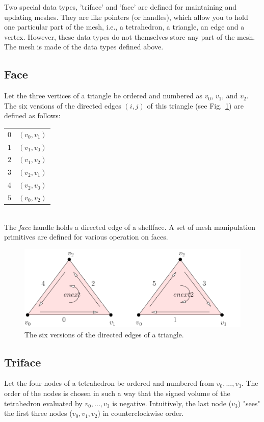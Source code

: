 Two special data types, 'triface' and 'face' are defined for maintaining and updating meshes. They are like pointers (or handles), which allow you to hold one particular part of the mesh, i.e., a tetrahedron, a triangle, an edge and a vertex.  However, these data types do not themselves store any part of the mesh. The mesh is made of the data types defined above.

\subsection{Face}

Let the three vertices of a triangle be ordered and numbered as $v_0$, $v_1$, and $v_2$. The six versions of the directed edges $(i, j)$ of this triangle (see Fig.~\ref{fig:edge-versions}) are defined as follows:\\
\begin{tabular}{rl}
$0$ & $(v_0, v_1)$\\
$1$ & $(v_1, v_0)$\\
$2$ & $(v_1, v_2)$\\
$3$ & $(v_2, v_1)$\\
$4$ & $(v_2, v_0)$\\
$5$ & $(v_0, v_2)$
\end{tabular}\\
The {\it face} handle holds a directed edge of a shellface. A set of mesh manipulation primitives are defined for various operation on faces.

\begin{figure}
  \centering
  \includegraphics[width=1.0\textwidth]{../figs/face-versions}
\caption{The six versions of the directed edges of a triangle.}
\label{fig:edge-versions}
\end{figure}

\subsection{Triface}

Let the four nodes of a tetrahedron be ordered and numbered from $v_0, ..., v_3$. The order of the nodes is chosen in such a way that the signed volume of the tetrahedron evaluated by $v_0, ..., v_3$ is negative. Intuitively, the last node ($v_3$) "sees" the first three nodes ($v_0, v_1, v_2$) in counterclockwise order. 

